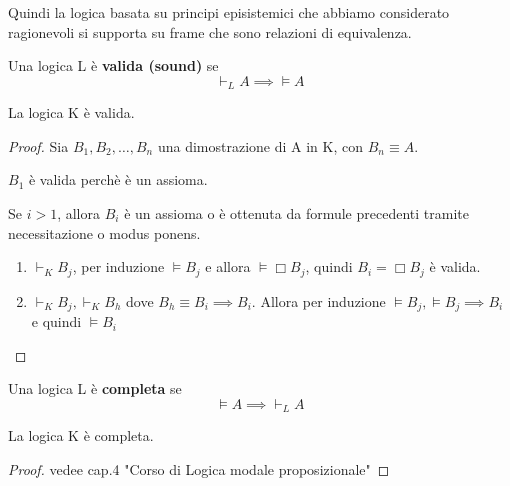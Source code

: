 \documentclass[10pt,a4paper,twoside]{book}
\begin{document}
Quindi la logica basata su principi episistemici che abbiamo considerato ragionevoli si supporta su frame che sono relazioni di equivalenza.
\begin{definition}
    Una logica L è \textbf{valida (sound)} se
    \begin{equation*}
        \vdash_L A \implies \vDash A
    \end{equation*}
\end{definition}
\begin{theorem}
    La logica K è valida.
\end{theorem}
\begin{proof}
    Sia $B_1,B_2,\ldots,B_n$ una dimostrazione di A in K, con $B_n \equiv A$.

    $B_1$ è valida perchè è un assioma.

    Se $i > 1$, allora $B_i$ è un assioma o è ottenuta da formule precedenti tramite necessitazione o modus ponens.
    \begin{enumerate}
        \item $\vdash_K B_j$, per induzione $\vDash B_j$ e allora $\vDash \Box B_j$, quindi $B_i = \Box B_j$ è valida.
        \item $\vdash_K B_j, \vdash_K B_h$ dove $B_h \equiv B_i \implies B_i$. Allora per induzione $\vDash B_j, \vDash B_j \implies B_i$\\
              e quindi $\vDash B_i$
    \end{enumerate}
\end{proof}
\begin{definition}
    Una logica L è \textbf{completa} se
    \begin{equation*}
        \vDash A \implies \vdash_L A
    \end{equation*}
\end{definition}
\begin{theorem}
    La logica K è completa.
\end{theorem}
\begin{proof}
    vedee cap.4 "Corso di Logica modale proposizionale"
\end{proof}
\end{document}
